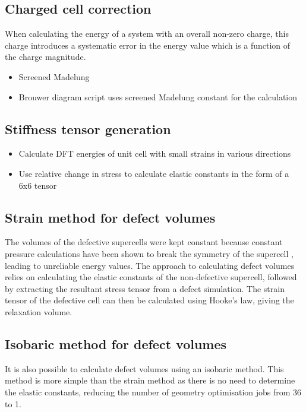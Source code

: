 \subsection{Charged cell correction}

When calculating the energy of a system with an overall non-zero charge, this charge introduces a systematic error in the energy value which is a function of the charge magnitude. 

\begin{itemize}
\item Screened Madelung
\item Brouwer diagram script uses screened Madelung constant for the calculation
\end{itemize}

\subsection{Stiffness tensor generation}

\begin{itemize}
\item Calculate DFT energies of unit cell with small strains in various directions
\item Use relative change in stress to calculate elastic constants in the form of a 6x6 tensor
\end{itemize}

\subsection{Strain method for defect volumes}

The volumes of the defective supercells were kept constant because constant pressure calculations have been shown to break the symmetry of the supercell \cite{samanta2010thermodynamic}, leading to unreliable energy values. The approach to calculating defect volumes relies on calculating the elastic constants of the non-defective supercell, followed by extracting the resultant stress tensor from a defect simulation. The strain tensor of the defective cell can then be calculated using Hooke's law, giving the relaxation volume. 

\subsection{Isobaric method for defect volumes}

It is also possible to calculate defect volumes using an isobaric method. This method is more simple than the strain method as there is no need to determine the elastic constants, reducing the number of geometry optimisation jobs from 36 to 1. 


